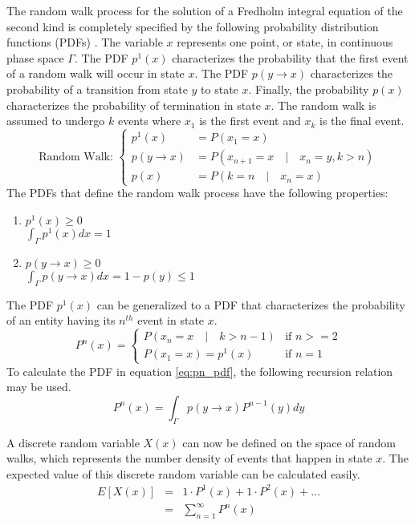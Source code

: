 The random walk process for the solution of a Fredholm integral equation of
the second kind is completely specified by the following probability
distribution functions (PDFs) \citep{spanier_monte_1969}. The variable $x$ 
represents one point, or state, in continuous phase space $\Gamma$. The 
PDF $p^1(x)$ characterizes the probability that the first event of a random 
walk will occur in state $x$. The PDF $p(y \to x)$ characterizes the probability
of a transition from state $y$ to state $x$. Finally, the probability $p(x)$
characterizes the probability of termination in state $x$. The random walk
is assumed to undergo $k$ events where $x_1$ is the first event and $x_k$ is
the final event.
\begin{equation}
  \text{Random Walk: }
  \begin{cases}
    p^1(x) & = P(x_1 = x) \\
    p(y \to x) & = P(x_{n+1} = x \quad|\quad x_n = y, k > n)  \\
    p(x) & = P(k = n \quad|\quad x_n = x) 
  \end{cases}
  \label{eq:mc_random_walk_pdfs}
\end{equation}
The PDFs that define the random walk process have the following properties:
\begin{enumerate}
  \item $p^1(x) \geq 0$ \\
  $\int_{\Gamma} p^1(x)dx = 1$
  \item $p(y \to x) \geq 0$ \\
  $\int_{\Gamma} p(y \to x)dx = 1 - p(y) \leq 1$
\end{enumerate}
The PDF $p^1(x)$ can be generalized to a PDF that characterizes the
probability of an entity having its $n^{th}$ event in state $x$. 
\begin{equation}
  P^n(x) = 
  \begin{cases} 
    P(x_n = x \quad|\quad k > n-1) & \text{if } n >= 2 \\
    P(x_1 = x) = p^1(x) & \text{if } n = 1 
  \end{cases}
  \label{eq:pn_pdf}
\end{equation}
To calculate the PDF in equation \ref{eq:pn_pdf}, the following recursion
relation may be used.
\begin{equation}
  P^n(x) = \int_{\Gamma} p(y \to x) P^{n-1}(y)dy
  \label{eq:pn_recursion_rel}
\end{equation}

A discrete random variable $X(x)$ can now be defined on the space of random 
walks, which represents the number density of events that happen in state $x$. 
The expected value of this discrete random variable can be calculated easily.
\begin{eqnarray}
  E[X(x)] & = & 1 \cdot P^1(x) + 1 \cdot P^2(x) + \ldots \nonumber \\
  & = & \sum_{n=1}^{\infty} P^n(x)
  \label{eq:expec_coll_dens}
\end{eqnarray}

